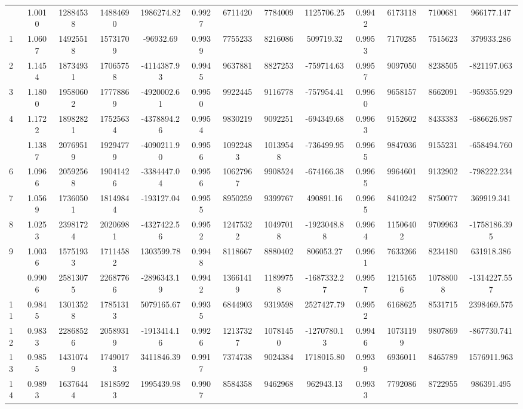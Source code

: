 \documentclass[
  12pt,
]{article}
\begin{document}
\begin{longtable}[t]{lcccccccccccc}
\endfoot
\bottomrule
\endlastfoot
0 & 1.0010 & 12884538 & 14884690 & 1986274.82 & 0.9927 & 6711420 & 7784009 & 1125706.25 & 0.9942 & 6173118 & 7100681 & 966177.147\\
1 & 1.0607 & 14925518 & 15731709 & -96932.69 & 0.9939 & 7755233 & 8216086 & 509719.32 & 0.9953 & 7170285 & 7515623 & 379933.286\\
2 & 1.1454 & 18734931 & 17065758 & -4114387.93 & 0.9945 & 9637881 & 8827253 & -759714.63 & 0.9957 & 9097050 & 8238505 & -821197.063\\
3 & 1.1800 & 19580602 & 17778869 & -4920002.61 & 0.9950 & 9922445 & 9116778 & -757954.41 & 0.9960 & 9658157 & 8662091 & -959355.929\\
4 & 1.1722 & 18982821 & 17525634 & -4378894.26 & 0.9954 & 9830219 & 9092251 & -694349.68 & 0.9963 & 9152602 & 8433383 & -686626.987\\
\addlinespace
5 & 1.1387 & 20769519 & 19294779 & -4090211.90 & 0.9956 & 10922483 & 10139548 & -736499.95 & 0.9965 & 9847036 & 9155231 & -658494.760\\
6 & 1.0966 & 20592568 & 19041426 & -3384447.04 & 0.9956 & 10627967 & 9908524 & -674166.38 & 0.9965 & 9964601 & 9132902 & -798222.234\\
7 & 1.0569 & 17360501 & 18149844 & -193127.04 & 0.9955 & 8950259 & 9399767 & 490891.16 & 0.9965 & 8410242 & 8750077 & 369919.341\\
8 & 1.0253 & 23981724 & 20206981 & -4327422.56 & 0.9952 & 12475322 & 10497018 & -1923048.88 & 0.9964 & 11506402 & 9709963 & -1758186.395\\
9 & 1.0036 & 15751933 & 17114582 & 1303599.78 & 0.9948 & 8118667 & 8880402 & 806053.27 & 0.9961 & 7633266 & 8234180 & 631918.386\\
\addlinespace
10 & 0.9906 & 25813075 & 22687766 & -2896343.19 & 0.9942 & 13661419 & 11899758 & -1687332.27 & 0.9957 & 12151656 & 10788008 & -1314227.557\\
11 & 0.9845 & 13013528 & 17851313 & 5079165.67 & 0.9935 & 6844903 & 9319598 & 2527427.79 & 0.9952 & 6168625 & 8531715 & 2398469.575\\
12 & 0.9833 & 22868526 & 20589319 & -1913414.16 & 0.9926 & 12137327 & 10781450 & -1270780.13 & 0.9946 & 10731199 & 9807869 & -867730.741\\
13 & 0.9855 & 14310749 & 17490173 & 3411846.39 & 0.9917 & 7374738 & 9024384 & 1718015.80 & 0.9939 & 6936011 & 8465789 & 1576911.963\\
14 & 0.9893 & 16376444 & 18185923 & 1995439.98 & 0.9907 & 8584358 & 9462968 & 962943.13 & 0.9933 & 7792086 & 8722955 & 986391.495\\

\end{longtable}
\end{document}
